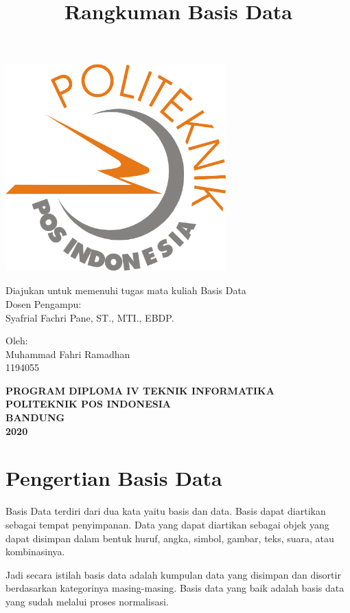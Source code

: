 \documentclass[a4paper,12pt] {article}
\title{Rangkuman Basis Data}
\author{}
\date{}
\begin{document}
\begin{titlepage}
\maketitle
\thispagestyle{empty}

\vspace{0.5cm}
\begin{center}
\includegraphics[width=8.5cm, height=8cm]{poltekpos.png}
\end{center}
\vspace{0.5cm}
\begin{center}
Diajukan untuk memenuhi tugas mata kuliah Basis Data\\
\vspace{12px}
Dosen Pengampu:\\
Syafrial Fachri Pane, ST., MTI., EBDP.
\vspace{12px}

Oleh:\\
Muhammad Fahri Ramadhan\\
1194055
\vspace{14px}

\textbf{PROGRAM DIPLOMA IV TEKNIK INFORMATIKA}\\
\textbf{POLITEKNIK POS INDONESIA\\}\textbf{BANDUNG}\\
\textbf{2020}
\end{center}
\end{titlepage}


\newpage

\maketitle

\section{Pengertian Basis Data}
Basis Data terdiri dari dua kata yaitu basis dan data. Basis dapat diartikan sebagai tempat penyimpanan. Data yang dapat diartikan sebagai objek yang dapat disimpan dalam bentuk huruf, angka, simbol, gambar, teks, suara, atau kombinasinya.
\par Jadi secara istilah basis data adalah kumpulan data yang disimpan dan disortir berdasarkan kategorinya masing-masing. Basis data yang baik adalah basis data yang sudah melalui proses normalisasi.
\end{document}
